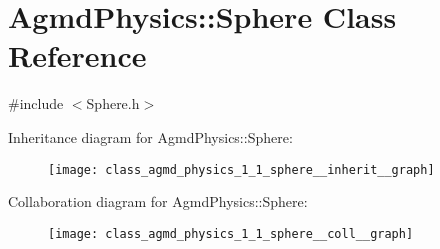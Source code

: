 \hypertarget{class_agmd_physics_1_1_sphere}{\section{Agmd\+Physics\+:\+:Sphere Class Reference}
\label{class_agmd_physics_1_1_sphere}
}


{\ttfamily \#include $<$Sphere.\+h$>$}



Inheritance diagram for Agmd\+Physics\+:\+:Sphere\+:\nopagebreak
\begin{figure}[H]
\begin{center}
\leavevmode
\texttt{[image: class\_agmd\_physics\_1\_1\_sphere\_\_inherit\_\_graph]}
\end{center}
\end{figure}


Collaboration diagram for Agmd\+Physics\+:\+:Sphere\+:\nopagebreak
\begin{figure}[H]
\begin{center}
\leavevmode
\texttt{[image: class\_agmd\_physics\_1\_1\_sphere\_\_coll\_\_graph]}
\end{center}
\end{figure}
